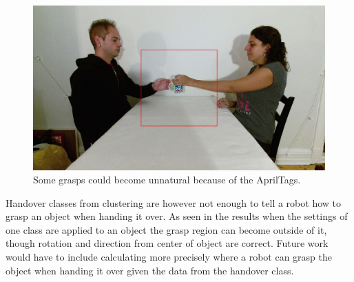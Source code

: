 \begin{figure}
	\centering
	\includegraphics[width=\textwidth]{img/conclusion/awkward_handover_frame.jpg}
	\caption{Some grasps could become unnatural because of the AprilTags.}
	\label{fig:fw_handover_awkward}
\end{figure}

Handover classes from clustering are however not enough to tell a robot how to grasp an object when handing it over. As seen in the results when the settings of one class are applied to an object the grasp region can become outside of it, though rotation and direction from center of object are correct. Future work would have to include calculating more precisely where a robot can grasp the object when handing it over given the data from the handover class.
